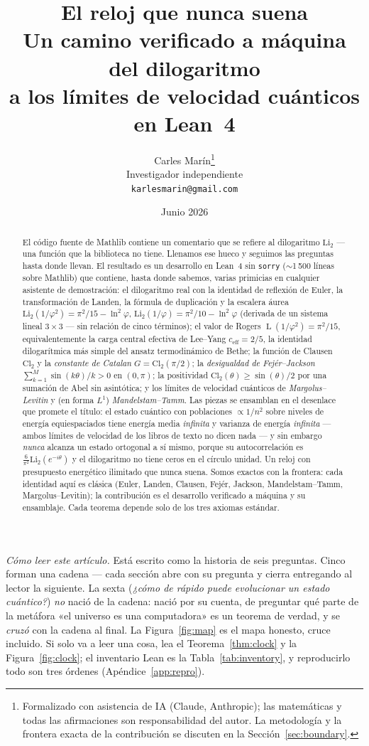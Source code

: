 \documentclass[11pt]{article}
\title{\bf El reloj que nunca suena\\[4pt]
  \large\normalfont Un camino verificado a m\'aquina del dilogaritmo\\
  a los l\'imites de velocidad cu\'anticos en Lean~4}
\author{Carles Mar\'in\thanks{Formalizado con asistencia de IA (Claude, Anthropic); las
matem\'aticas y todas las afirmaciones son responsabilidad del autor. La metodolog\'ia y
la frontera exacta de la contribuci\'on se discuten en la Secci\'on~\ref{sec:boundary}.}\\[3pt]
  \normalsize Investigador independiente\\
  \normalsize \texttt{karlesmarin@gmail.com}}
\date{Junio 2026}
\newcommand{\lean}[1]{\texttt{#1}}
\newcommand{\Li}{\mathrm{Li}_2}
\newcommand{\Cl}{\mathrm{Cl}_2}
\DeclareMathOperator{\Lrog}{L}
\begin{document}
\maketitle

\begin{abstract}
El c\'odigo fuente de Mathlib contiene un comentario que se refiere al dilogaritmo
$\Li$ --- una funci\'on que la biblioteca no tiene. Llenamos ese hueco y seguimos las
preguntas hasta donde llevan. El resultado es un desarrollo en Lean~4 sin \lean{sorry}
($\sim$1\,500 l\'ineas sobre Mathlib) que contiene, hasta donde sabemos, varias primicias
en cualquier asistente de demostraci\'on: el dilogaritmo real con la identidad de reflexi\'on
de Euler, la transformaci\'on de Landen, la f\'ormula de duplicaci\'on y la escalera
\'aurea $\Li(1/\varphi^2)=\pi^2/15-\ln^2\varphi$, $\Li(1/\varphi)=\pi^2/10-\ln^2\varphi$
(derivada de un sistema lineal $3\times 3$ --- sin relaci\'on de cinco t\'erminos); el
valor de Rogers $\Lrog(1/\varphi^2)=\pi^2/15$, equivalentemente la carga central
efectiva de Lee--Yang $c_{\mathrm{eff}}=2/5$, la identidad dilogar\'itmica m\'as simple
del ansatz termodin\'amico de Bethe; la funci\'on de Clausen $\Cl$ y la \emph{constante
de Catalan} $G=\Cl(\pi/2)$; la \emph{desigualdad de Fej\'er--Jackson}
$\sum_{k=1}^{M}\sin(k\theta)/k>0$ en $(0,\pi)$; la positividad
$\Cl(\theta)\ge\sin(\theta)/2$ por una sumaci\'on de Abel sin asint\'otica; y los
l\'imites de velocidad cu\'anticos de \emph{Margolus--Levitin} y (en forma $L^1$)
\emph{Mandelstam--Tamm}. Las piezas se ensamblan en el desenlace que promete el
t\'itulo: el estado cu\'antico con poblaciones $\propto 1/n^2$ sobre niveles de
energ\'ia equiespaciados tiene energ\'ia media \emph{infinita} y varianza de energ\'ia
\emph{infinita} --- ambos l\'imites de velocidad de los libros de texto no dicen nada ---
y sin embargo \emph{nunca} alcanza un estado ortogonal a s\'i mismo, porque su
autocorrelaci\'on es $\tfrac{6}{\pi^2}\Li(e^{-i\theta})$ y el dilogaritmo no tiene
ceros en el c\'irculo unidad. Un reloj con presupuesto energ\'etico ilimitado que nunca
suena. Somos exactos con la frontera: cada identidad aqu\'i es cl\'asica (Euler, Landen,
Clausen, Fej\'er, Jackson, Mandelstam--Tamm, Margolus--Levitin); la contribuci\'on es el
desarrollo verificado a m\'aquina y su ensamblaje. Cada teorema depende solo de los tres
axiomas est\'andar.
\end{abstract}

\medskip
\noindent\emph{C\'omo leer este art\'iculo.} Est\'a escrito como la historia de seis
preguntas. Cinco forman una cadena --- cada secci\'on abre con su pregunta y cierra
entregando al lector la siguiente. La sexta (\emph{¿c\'omo de r\'apido puede
evolucionar un estado cu\'antico?}) \emph{no} naci\'o de la cadena: naci\'o por su
cuenta, de preguntar qu\'e parte de la met\'afora «el universo es una computadora» es un
teorema de verdad, y se \emph{cruz\'o} con la cadena al final. La
Figura~\ref{fig:map} es el mapa honesto, cruce incluido. Si solo va a leer una cosa,
lea el Teorema~\ref{thm:clock} y la Figura~\ref{fig:clock}; el inventario Lean es la
Tabla~\ref{tab:inventory}, y reproducirlo todo son tres \'ordenes
(Ap\'endice~\ref{app:repro}).
\end{document}
